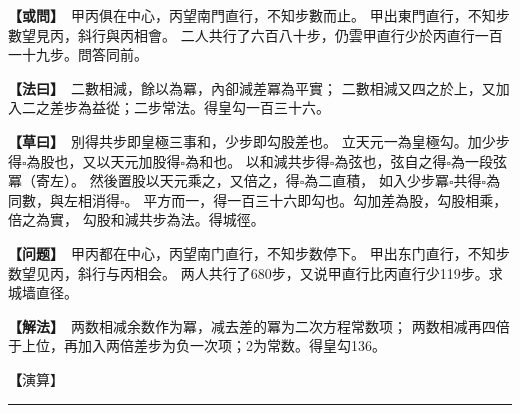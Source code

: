 \documentclass[11pt,a4paper]{article}
\let\origsquare\square
\renewcommand{\square}{\ensuremath{\origsquare}}%
\newcommand{\longline}{\noindent\rule{\textwidth}{0.4pt}}
\newcommand{\clOWEN}[1]{%
  \par\vspace{0.3em}%
  \noindent\textcolor{problemcolor}{\textbf{【或問】}}\,{\tradfont #1}\par\nopagebreak%
}
\newcommand{\mdOWEN}[1]{%
  \par\vspace{0.3em}%
  \noindent\textcolor{problemcolor}{\textbf{【问题】}}\,{\modfont #1}\par\nopagebreak%
}
\newcommand{\clFAYUE}[1]{%
  \par\noindent\textcolor{methodcolor}{\textbf{【法曰】}}\,{\tradfont #1}\par\nopagebreak%
}
\newcommand{\mdFAYUE}[1]{%
  \par\noindent\textcolor{methodcolor}{\textbf{【解法】}}\,{\modfont #1}\par\nopagebreak%
}
\newcommand{\clTSAOYUE}[1]{%
  \par\noindent\textcolor{workcolor}{\textbf{【草曰】}}\,{\tradfont #1}\par%
}
\newcommand{\mdTSAOYUE}[1]{%
  \par\noindent\textcolor{workcolor}{\textbf【演算】}}\,{\modfont #1}\par%
\begin{document}
\begin{paracol}{2}

\begin{leftcolumn}
\clOWEN{%
甲丙俱在中心，丙望南門直行，不知步數而止。
甲出東門直行，不知步數望見丙，斜行與丙相會。
二人共行了六百八十步，仍雲甲直行少於丙直行一百一十九步。問答同前。}

\clFAYUE{%
二數相減，餘以為冪，內卻減差冪為平實；
二數相減又四之於上，又加入二之差步為益從；二步常法。得皇勾一百三十六。}

\clTSAOYUE{%
別得共步即皇極三事和，少步即勾股差也。
立天元一為皇極勾。加少步得$\square$為股也，又以天元加股得$\square$為和也。
以和減共步得$\square$為弦也，弦自之得$\square$為一段弦冪（寄左）。
然後置股以天元乘之，又倍之，得$\square$為二直積，
如入少步冪$\square$共得$\square$為同數，與左相消得$\square$。
平方而一，得一百三十六即勾也。勾加差為股，勾股相乘，倍之為實，
勾股和減共步為法。得城徑。}
\end{leftcolumn}

\switchcolumn

\begin{rightcolumn}
\mdOWEN{%
甲丙都在中心，丙望南门直行，不知步数停下。
甲出东门直行，不知步数望见丙，斜行与丙相会。
两人共行了680步，又说甲直行比丙直行少119步。求城墙直径。}

\mdFAYUE{%
两数相减余数作为冪，减去差的冪为二次方程常数项；
两数相减再四倍于上位，再加入两倍差步为负一次项；2为常数。得皇勾136。}

\mdTSAOYUE{%
辨识得：共步即皇极三事和，少步即勾股差。
设天元一为皇极勾。加少步得$\square$为股，又以天元加股得$\square$为和。
以和减共步得$\square$为弦，弦自乘得$\square$为一段弦冪（寄左）。
然后取股以天元乘之再两倍得$\square$为两倍直积，
加入少步冪$\square$共得$\square$为同数，与左式相消得$\square$。
开平方得136即勾。勾加差为股，勾股相乘两倍为被除数，
勾股和减共步为除数。得城径。}
\end{rightcolumn}

\end{paracol}

\vspace{0.3cm}
\begin{center}\longline\end{center}
\end{document}
